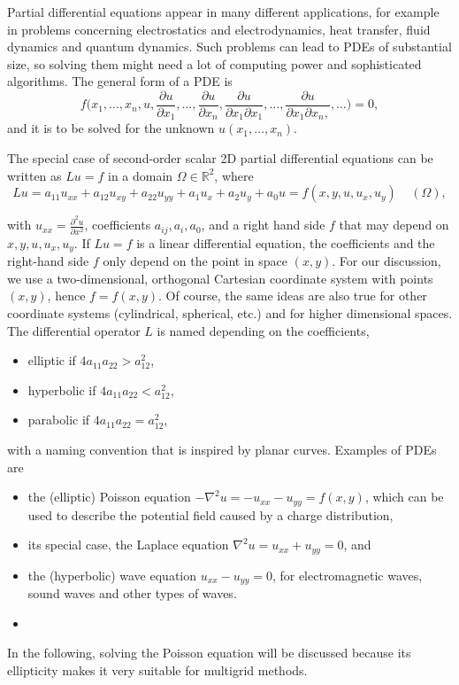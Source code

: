 Partial differential equations appear in many different applications, for example in problems concerning electrostatics and electrodynamics, heat transfer, fluid dynamics and quantum dynamics. Such problems can lead to PDEs of substantial size, so solving them might need a lot of computing power and sophisticated algorithms. The general form of a PDE is
\begin{equation}
f\big(x_1, \hdots, x_n, u, \frac{\partial u}{\partial x_1}, \hdots, \frac{\partial u}{\partial x_n}, \frac{\partial u}{\partial x_1 \partial x_1} , \hdots, \frac{\partial u}{\partial x_1 \partial x_n, },  \hdots \big) = 0, 
\end{equation}
and it is to be solved for the unknown $u(x_1, \hdots, x_n)$.

The special case of second-order scalar 2D partial differential equations can be written as $Lu = f$ in a domain $\Omega \in \mathbb{R}^2$, where 
\begin{equation}
Lu = a_{11}u_{xx} + a_{12}u_{xy} + a_{22}u_{yy} + a_{1}u_{x} + a_{2}u_{y} + a_{0}u = f(x, y, u, u_x, u_y)~~~~~(\Omega),
\label{equ:2D_part_differ}
\end{equation}

with $u_{xx} = \frac{\partial ^2u}{\partial x^2}$, coefficients $a_{ij}, a_i, a_0$, and a right hand side $f$ that may depend on $x, y, u, u_x, u_y$. If $Lu = f$ is a linear differential equation, the coefficients and the right-hand side $f$ only depend on the point in space $(x,y)$. For our discussion, we use a two-dimensional, orthogonal Cartesian coordinate system with points $(x,y)$, hence $f = f(x,y)$. Of course, the same ideas are also true for other coordinate systems (cylindrical, spherical, etc.) and for higher dimensional spaces.  The differential operator $L$ is named depending on the coefficients, 
\begin{itemize}
\item elliptic if $4a_{11}a_{22} > a_{12}^2$,
\item hyperbolic if $4a_{11}a_{22} < a_{12}^2$,
\item parabolic if $4a_{11}a_{22} = a_{12}^2$,
\end{itemize}
with a naming convention that is inspired by planar curves. Examples of PDEs are 
\begin{itemize}
\item the (elliptic) Poisson equation $-\nabla^2 u = -u_{xx} - u_{yy} = f(x,y)$, which can be used to describe the potential field caused by a charge distribution,
\item its special case, the Laplace equation $\nabla^2 u = u_{xx}  + u_{yy} = 0$, and
\item the (hyperbolic) wave equation $u_{xx} - u_{yy} = 0$, for electromagnetic waves, sound waves and other types of waves.
\item 
\end{itemize}
In the following, solving the Poisson equation will be discussed because its ellipticity makes it very suitable for multigrid methods.

